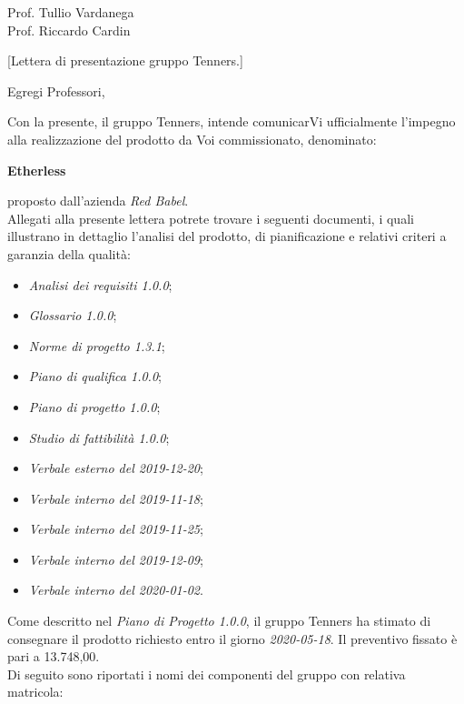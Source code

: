\begin{letter}{\begin{flushright}
			Prof. Tullio Vardanega \\
			Prof. Riccardo Cardin 
	\end{flushright}}[Lettera di presentazione gruppo Tenners.]
\opening[Padova, ]{Egregi Professori,}
	\noindent Con la presente, il gruppo Tenners, intende comunicarVi ufficialmente l'impegno alla realizzazione del prodotto da Voi commissionato, denominato:
	\begin{center}
		\textbf{Etherless}
	\end{center}
    proposto dall'azienda \textit{Red Babel}. \\
    \noindent Allegati alla presente lettera potrete trovare i seguenti documenti, i quali illustrano in dettaglio l'analisi del prodotto, di pianificazione e relativi criteri a garanzia della qualità:
    \begin{itemize}
    	\item \textit{Analisi dei requisiti 1.0.0};
    	\item \textit{Glossario 1.0.0};
    	\item \textit{Norme di progetto 1.3.1};
    	\item \textit{Piano di qualifica 1.0.0};
    	\item \textit{Piano di progetto 1.0.0};
    	\item \textit{Studio di fattibilità 1.0.0};
    	\item \textit{Verbale esterno del 2019-12-20};
    	\item \textit{Verbale interno del 2019-11-18};
    	\item \textit{Verbale interno del 2019-11-25};
    	\item \textit{Verbale interno del 2019-12-09};
    	\item \textit{Verbale interno del 2020-01-02}.
    \end{itemize}
    Come descritto nel \textit{Piano di Progetto 1.0.0}\docs, il gruppo Tenners ha stimato di consegnare il prodotto richiesto entro il giorno \textit{2020-05-18}. Il preventivo fissato è pari a 13.748,00\officialeuro.\\ 
    \noindent Di seguito sono riportati i nomi dei componenti del gruppo con relativa matricola:
    \begin{center}
    	\renewcommand{\arraystretch}{1.8}
    	

\end{center}
\end{letter}
